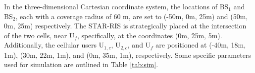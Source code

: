 \documentclass[conference]{IEEEtran}
\begin{document}
\begin{table}[b!]
    \centering
    \setlength{\arrayrulewidth}{0.3pt} %
    \caption{Simulation Parameters}
    \label{tab:sim}
\end{table}
In the three-dimensional Cartesian coordinate system, the locations of BS$_1$ and BS$_2$, each with a coverage radius of 60 m, are set to (-50m, 0m, 25m) and (50m, 0m, 25m) respectively. The STAR-RIS is strategically placed at the intersection of the two cells, near U$_f$, specifically, at the coordinates (0m, 25m, 5m). Additionally, the cellular users U$_{1,c}$, U$_{2,c}$, and U$_f$ are positioned at (-40m, 18m, 1m), (30m, 22m, 1m), and (0m, 35m, 1m), respectively. Some specific parameters used for simulation are outlined in Table \ref{tab:sim}.
\end{document}
